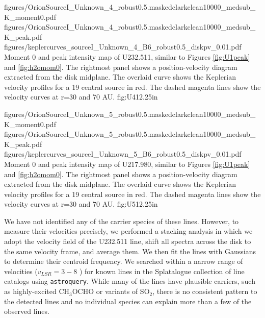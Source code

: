 \documentclass[twocolumn]{aastex61}
\begin{document}
\FigureThree
{{figures/OrionSourceI_Unknown_4_robust0.5.maskedclarkclean10000_medsub_K_moment0}.pdf}
{{figures/OrionSourceI_Unknown_4_robust0.5.maskedclarkclean10000_medsub_K_peak}.pdf}
{{figures/keplercurves_sourceI_Unknown_4_B6_robust0.5_diskpv_0.01}.pdf}
{Moment 0 and peak intensity map of U232.511, similar to Figures \ref{fig:U1peak} and \ref{fig:h2omom0}.
The rightmost panel shows a position-velocity diagram extracted from the disk midplane.
The overlaid  curve shows the Keplerian velocity profiles for a 19 \msun central source in red.
The dashed magenta lines show the velocity curves at r=30 and 70 AU.
}
{fig:U4}{1}{2.25in}

\FigureThree
{{figures/OrionSourceI_Unknown_5_robust0.5.maskedclarkclean10000_medsub_K_moment0}.pdf}
{{figures/OrionSourceI_Unknown_5_robust0.5.maskedclarkclean10000_medsub_K_peak}.pdf}
{{figures/keplercurves_sourceI_Unknown_5_B6_robust0.5_diskpv_0.01}.pdf}
{Moment 0 and peak intensity map of U217.980, similar to Figures \ref{fig:U1peak} and \ref{fig:h2omom0}.
The rightmost panel shows a position-velocity diagram extracted from the disk midplane.
The overlaid  curve shows the Keplerian velocity profiles for a 19 \msun central source in red.
The dashed magenta lines show the velocity curves at r=30 and 70 AU.
}
{fig:U5}{1}{2.25in}







We have not identified any of the carrier species of these lines.
However, to measure their velocities precisely, we performed a stacking
analysis in which we adopt the velocity field of the U232.511 line,
shift all spectra across the disk to the same velocity frame, and average them.
We then fit the lines with Gaussians to determine their centroid frequency.
We searched within a narrow range of velocities ($v_{LSR}=3-8$ \kms)
for known lines in the Splatalogue collection of line catalogs using
\texttt{astroquery}.
While many of the lines have plausible carriers, such as highly-excited
CH$_3$OCHO or variants of SO$_2$, there is no consistent pattern to the detected
lines and no individual species can explain more than a few of the observed
lines.
\end{document}

